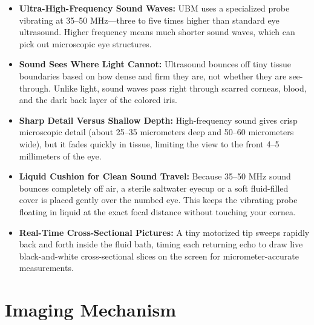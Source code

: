 \begin{itemize}
    \item \textbf{Ultra-High-Frequency Sound Waves:} UBM uses a specialized probe vibrating at 35--50 MHz---three to five times higher than standard eye ultrasound. Higher frequency means much shorter sound waves, which can pick out microscopic eye structures.
    \item \textbf{Sound Sees Where Light Cannot:} Ultrasound bounces off tiny tissue boundaries based on how dense and firm they are, not whether they are see-through. Unlike light, sound waves pass right through scarred corneas, blood, and the dark back layer of the colored iris.
    \item \textbf{Sharp Detail Versus Shallow Depth:} High-frequency sound gives crisp microscopic detail (about 25--35 micrometers deep and 50--60 micrometers wide), but it fades quickly in tissue, limiting the view to the front 4--5 millimeters of the eye.
    \item \textbf{Liquid Cushion for Clean Sound Travel:} Because 35--50 MHz sound bounces completely off air, a sterile saltwater eyecup or a soft fluid-filled cover is placed gently over the numbed eye. This keeps the vibrating probe floating in liquid at the exact focal distance without touching your cornea.
    \item \textbf{Real-Time Cross-Sectional Pictures:} A tiny motorized tip sweeps rapidly back and forth inside the fluid bath, timing each returning echo to draw live black-and-white cross-sectional slices on the screen for micrometer-accurate measurements.
\end{itemize}

\section{Imaging Mechanism}


